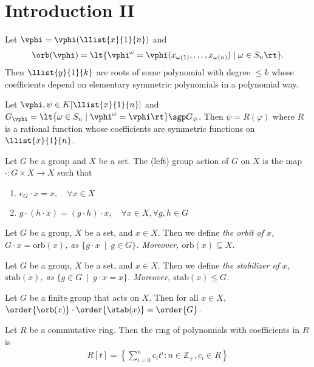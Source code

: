 \documentclass[a4paper]{article}
\begin{document}
\section{Introduction II}
\begin{ttheorem}[Lagrange]
  Let \( \vphi=\vphi(\llist{x}{1}{n}) \) and \begin{align*}
    \orb(\vphi) = \lt\{ \vphi^\omega = \vphi(x_{\omega(1)},\ldots,x_{\omega(n)}) \mid\omega\in S_n \rt\}.
  \end{align*}
  Then \( \llist{y}{1}{k} \) are roots of some polynomial with degree \( \leq k \) whose coefficients depend on elementary symmetric polynomials  in a polynomial way.
\end{ttheorem}

\begin{ttheorem}[Lagrange]
  Let \( \vphi,\psi\in K[\llist{x}{1}{n}] \) and \( G_\vphi=\lt\{ \omega\in S_n \mid \vphi^\omega=\vphi \rt\} \sgp G_\psi \).
  Then \( \psi = R(\varphi) \) where \( R \) is a rational function whose coefficients are symmetric functions on \( \llist{x}{1}{n} \).
\end{ttheorem}

\begin{tdefinition}
  Let \( G \) be a group and \( X \) be a set. The (left) group action of \( G \) on \( X \) is the map \( \cdot:G\times X\to X \) such that \begin{enumerate}
    \item \( e_G\cdot x = x, \quad \forall x\in X \)
    \item \( g\cdot (h\cdot x)=(g\cdot h)\cdot x,\quad \forall x\in X,\forall g,h\in G \)
  \end{enumerate}
\end{tdefinition}

\begin{tdefinition}[Orbit]
  Let \( G \) be a group, \( X \) be a set, and \( x\in X \).
  Then we define \it{the orbit} of \( x \), \( G\cdot x = \text{orb}(x) \), as \( \{g\cdot x \ \mid \ g\in G\} \).
  Moreover, \( \text{orb}(x)\subseteq X \).
\end{tdefinition}

\begin{tdefinition}[Stabilizer]
  Let \( G \) be a group, \( X \) be a set, and \( x\in X \).
  Then we define \it{the stabilizer} of \( x \), \( \text{stab}(x) \), as \( \{g\in G \ \mid \ g\cdot x = x\} \).
  Moreover, \( \text{stab}(x)\leq G \).
\end{tdefinition}

\begin{ttheorem}
  Let \( G \) be a finite group that acts on \( X \). Then for all \( x\in X \), \( \order{\orb(x)} \cdot \order{\stab(x)} = \order{G} \).
\end{ttheorem}

\begin{tdefinition}
  Let \( R \) be a commutative ring. Then the ring of polynomials with coefficients in \( R \) is
  \begin{align*}
    R[t] = \left\{\sum_{i=0}^n c_it^i : n\in\mathbb{Z}_+, c_i\in R\right\}
  \end{align*}
\end{tdefinition}
\end{document}
